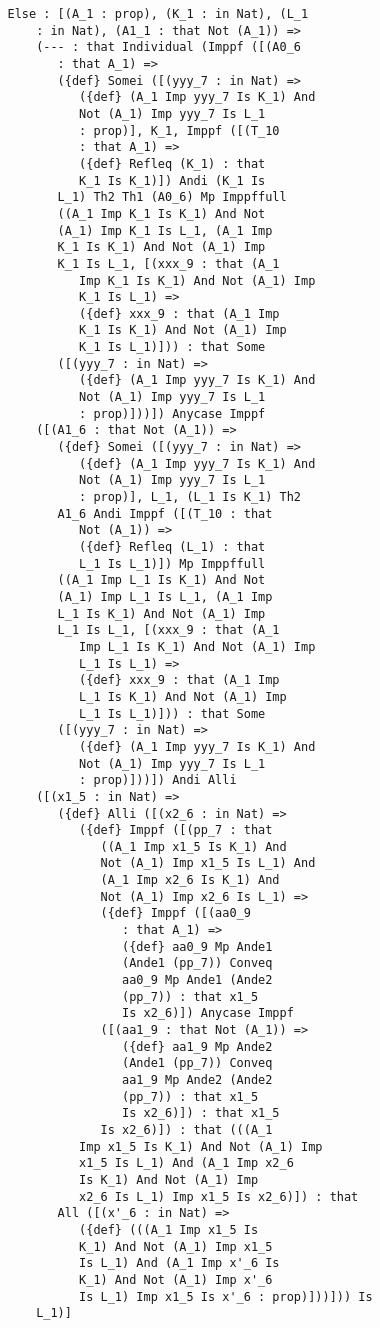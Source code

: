 \documentclass{article}
\begin{document}
\begin{verbatim}
   Else : [(A_1 : prop), (K_1 : in Nat), (L_1 
       : in Nat), (A1_1 : that Not (A_1)) => 
       (--- : that Individual (Imppf ([(A0_6 
          : that A_1) => 
          ({def} Somei ([(yyy_7 : in Nat) => 
             ({def} (A_1 Imp yyy_7 Is K_1) And 
             Not (A_1) Imp yyy_7 Is L_1 
             : prop)], K_1, Imppf ([(T_10 
             : that A_1) => 
             ({def} Refleq (K_1) : that 
             K_1 Is K_1)]) Andi (K_1 Is 
          L_1) Th2 Th1 (A0_6) Mp Imppffull 
          ((A_1 Imp K_1 Is K_1) And Not 
          (A_1) Imp K_1 Is L_1, (A_1 Imp 
          K_1 Is K_1) And Not (A_1) Imp 
          K_1 Is L_1, [(xxx_9 : that (A_1 
             Imp K_1 Is K_1) And Not (A_1) Imp 
             K_1 Is L_1) => 
             ({def} xxx_9 : that (A_1 Imp 
             K_1 Is K_1) And Not (A_1) Imp 
             K_1 Is L_1)])) : that Some 
          ([(yyy_7 : in Nat) => 
             ({def} (A_1 Imp yyy_7 Is K_1) And 
             Not (A_1) Imp yyy_7 Is L_1 
             : prop)]))]) Anycase Imppf 
       ([(A1_6 : that Not (A_1)) => 
          ({def} Somei ([(yyy_7 : in Nat) => 
             ({def} (A_1 Imp yyy_7 Is K_1) And 
             Not (A_1) Imp yyy_7 Is L_1 
             : prop)], L_1, (L_1 Is K_1) Th2 
          A1_6 Andi Imppf ([(T_10 : that 
             Not (A_1)) => 
             ({def} Refleq (L_1) : that 
             L_1 Is L_1)]) Mp Imppffull 
          ((A_1 Imp L_1 Is K_1) And Not 
          (A_1) Imp L_1 Is L_1, (A_1 Imp 
          L_1 Is K_1) And Not (A_1) Imp 
          L_1 Is L_1, [(xxx_9 : that (A_1 
             Imp L_1 Is K_1) And Not (A_1) Imp 
             L_1 Is L_1) => 
             ({def} xxx_9 : that (A_1 Imp 
             L_1 Is K_1) And Not (A_1) Imp 
             L_1 Is L_1)])) : that Some 
          ([(yyy_7 : in Nat) => 
             ({def} (A_1 Imp yyy_7 Is K_1) And 
             Not (A_1) Imp yyy_7 Is L_1 
             : prop)]))]) Andi Alli 
       ([(x1_5 : in Nat) => 
          ({def} Alli ([(x2_6 : in Nat) => 
             ({def} Imppf ([(pp_7 : that 
                ((A_1 Imp x1_5 Is K_1) And 
                Not (A_1) Imp x1_5 Is L_1) And 
                (A_1 Imp x2_6 Is K_1) And 
                Not (A_1) Imp x2_6 Is L_1) => 
                ({def} Imppf ([(aa0_9 
                   : that A_1) => 
                   ({def} aa0_9 Mp Ande1 
                   (Ande1 (pp_7)) Conveq 
                   aa0_9 Mp Ande1 (Ande2 
                   (pp_7)) : that x1_5 
                   Is x2_6)]) Anycase Imppf 
                ([(aa1_9 : that Not (A_1)) => 
                   ({def} aa1_9 Mp Ande2 
                   (Ande1 (pp_7)) Conveq 
                   aa1_9 Mp Ande2 (Ande2 
                   (pp_7)) : that x1_5 
                   Is x2_6)]) : that x1_5 
                Is x2_6)]) : that (((A_1 
             Imp x1_5 Is K_1) And Not (A_1) Imp 
             x1_5 Is L_1) And (A_1 Imp x2_6 
             Is K_1) And Not (A_1) Imp 
             x2_6 Is L_1) Imp x1_5 Is x2_6)]) : that 
          All ([(x'_6 : in Nat) => 
             ({def} (((A_1 Imp x1_5 Is 
             K_1) And Not (A_1) Imp x1_5 
             Is L_1) And (A_1 Imp x'_6 Is 
             K_1) And Not (A_1) Imp x'_6 
             Is L_1) Imp x1_5 Is x'_6 : prop)]))])) Is 
       L_1)]



\end{verbatim}
\end{document}
